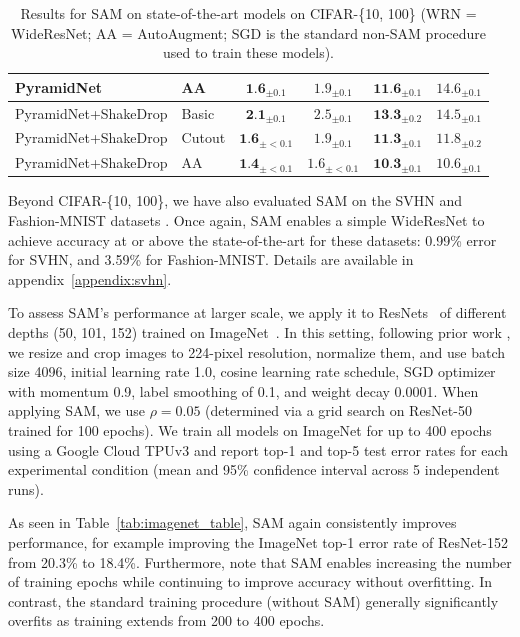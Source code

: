 \documentclass{article} %
\begin{document}
\begin{table}[!htb]
\begin{tabular}{ll|cc|cc|}
\multicolumn{1}{|l|}{PyramidNet}                  & AA      & $\textbf{1.6}_{\pm 0.1}$  & $1.9_{\pm 0.1}$       & $\textbf{11.6}_{\pm 0.1}$ & $14.6_{\pm 0.1}$     \\ \hline
\multicolumn{1}{|l|}{PyramidNet+ShakeDrop}        & Basic        & $\textbf{2.1}_{\pm 0.1}$  & $2.5_{\pm 0.1}$       & $\textbf{13.3}_{\pm 0.2}$ & $14.5_{\pm 0.1}$     \\
\multicolumn{1}{|l|}{PyramidNet+ShakeDrop}        & Cutout       & $\textbf{1.6}_{\pm<0.1}$   & $1.9_{\pm 0.1}$      & $\textbf{11.3}_{\pm 0.1}$ & $11.8_{\pm 0.2}$     \\
\multicolumn{1}{|l|}{PyramidNet+ShakeDrop}        & AA      & $\textbf{1.4}_{\pm<0.1}$    & $1.6_{\pm<0.1}$     & $\textbf{10.3}_{\pm 0.1}$ & $10.6_{\pm 0.1}$     \\ \hline
\end{tabular}
\caption{Results for SAM on state-of-the-art models on CIFAR-\{10, 100\} (WRN  = WideResNet; AA = AutoAugment; SGD is the standard non-SAM procedure used to train these models).}
\label{tab:cifar}
\end{table}

Beyond CIFAR-\{10, 100\}, we have also evaluated SAM on the SVHN \citep{svhn} and Fashion-MNIST datasets \citep{fmnist}.  Once again, SAM enables a simple WideResNet to achieve accuracy at or above the state-of-the-art for these datasets: 0.99\% error for SVHN, and 3.59\% for Fashion-MNIST. Details are available in appendix~\ref{appendix:svhn}.


To assess SAM's performance at larger scale, we apply it to ResNets~\citep{resnet} of different depths (50, 101, 152) trained on ImageNet~\citep{imagenet_cvpr09}.  In this setting, following prior work \citep{resnet, szegedy2015rethinking}, we resize and crop images to 224-pixel resolution, normalize them, and use batch size 4096, initial learning rate 1.0, cosine learning rate schedule, SGD optimizer with momentum 0.9, label smoothing of 0.1, and weight decay 0.0001.  When applying SAM, we use $\rho = 0.05$ (determined via a grid search on ResNet-50 trained for 100 epochs).  We train all models on ImageNet for up to 400 epochs using a Google Cloud TPUv3 and report top-1 and top-5 test error rates for each experimental condition (mean and 95\% confidence interval across 5 independent runs).

As seen in Table~\ref{tab:imagenet_table}, SAM again consistently improves performance, for example improving the ImageNet top-1 error rate of ResNet-152 from 20.3\% to 18.4\%.  Furthermore, note that SAM enables increasing the number of training epochs while continuing to improve accuracy without overfitting.  In contrast, the standard training procedure (without SAM) generally significantly overfits as training extends from 200 to 400 epochs.
\end{document}
